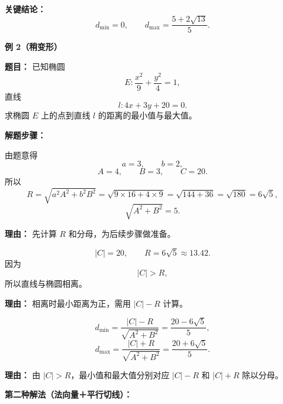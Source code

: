 \begin{examplebox}
	\textbf{\textcolor{CExample}{关键结论：}}
	\[
		d_{\min}=0,
		\qquad
		d_{\max}=\frac{5+2\sqrt{13}}{5}.
	\]

	\medskip

	\textbf{\textcolor{CExample}{例 2（稍变形）}}

	\textbf{\textcolor{CExample}{题目：}}
	已知椭圆
	\[
		E:\frac{x^2}{9}+\frac{y^2}{4}=1,
	\]
	直线
	\[
		l:4x+3y+20=0.
	\]
	求椭圆 \(E\) 上的点到直线 \(l\) 的距离的最小值与最大值。

	\textbf{\textcolor{CExample}{解题步骤：}}

	\begin{description}[style=nextline, leftmargin=2.8em, labelsep=0.5em, itemsep=0.45em]
		\item[\textbf{第一步（计算基本量）：}]
		      由题意得
		      \[
			      a=3,\qquad b=2,
		      \]
		      \[
			      A=4,\qquad B=3,\qquad C=20.
		      \]
		      所以
		      \[
			      R=\sqrt{a^2A^2+b^2B^2}
			      =
			      \sqrt{9\times 16+4\times 9}
			      =
			      \sqrt{144+36}
			      =
			      \sqrt{180}
			      =
			      6\sqrt{5},
		      \]
		      \[
			      \sqrt{A^2+B^2}=5.
		      \]

		      \par\textbf{理由：}
		      先计算 \(R\) 和分母，为后续步骤做准备。

		\item[\textbf{第二步（比较 \(|C|\) 与 \(R\)：}]
		      \[
			      |C|=20,
			      \qquad
			      R=6\sqrt5\approx 13.42.
		      \]
		      因为
		      \[
			      |C|>R,
		      \]
		      所以直线与椭圆相离。

		      \par\textbf{理由：}
		      相离时最小距离为正，需用 \(|C|-R\) 计算。

		\item[\textbf{第三步（套用最值公式）：}]
		      \[
			      d_{\min}
			      =
			      \frac{|C|-R}{\sqrt{A^2+B^2}}
			      =
			      \frac{20-6\sqrt5}{5},
		      \]
		      \[
			      d_{\max}
			      =
			      \frac{|C|+R}{\sqrt{A^2+B^2}}
			      =
			      \frac{20+6\sqrt5}{5}.
		      \]

		      \par\textbf{理由：}
		      由 \(|C|>R\)，最小值和最大值分别对应 \(|C|-R\) 和 \(|C|+R\) 除以分母。
	\end{description}

	\textbf{\textcolor{CExample}{第二种解法（法向量＋平行切线）：}}


\end{examplebox}
